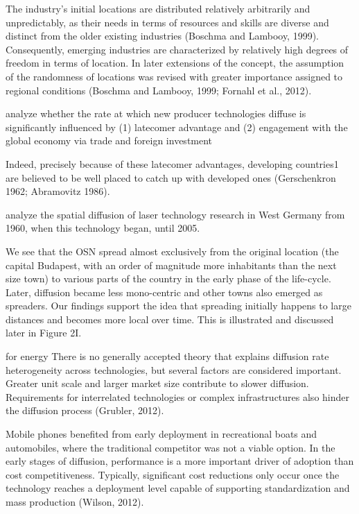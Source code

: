\documentclass[preprint, 3p,
authoryear]{elsarticle} %
\begin{document}
The industry's initial locations are distributed relatively arbitrarily
and unpredictably, as their needs in terms of resources and skills are
diverse and distinct from the older existing industries (Boschma and
Lambooy, 1999). Consequently, emerging industries are characterized by
relatively high degrees of freedom in terms of location. In later
extensions of the concept, the assumption of the randomness of locations
was revised with greater importance assigned to regional conditions
(Boschma and Lambooy, 1999; Fornahl et al., 2012).

\citet{perkins2005international} analyze whether the rate at which new
producer technologies diffuse is significantly influenced by (1)
latecomer advantage and (2) engagement with the global economy via trade
and foreign investment

Indeed, precisely because of these latecomer advantages, developing
countries1 are believed to be well placed to catch up with developed
ones (Gerschenkron 1962; Abramovitz 1986).

\citet{fritsch2015new} analyze the spatial diffusion of laser technology
research in West Germany from 1960, when this technology began, until
2005.

\citet{perkins2011internet}

\citet{lengyel2020role} We see that the OSN spread almost exclusively
from the original location (the capital Budapest, with an order of
magnitude more inhabitants than the next size town) to various parts of
the country in the early phase of the life-cycle. Later, diffusion
became less mono-centric and other towns also emerged as spreaders. Our
findings support the idea that spreading initially happens to large
distances and becomes more local over time. This is illustrated and
discussed later in Figure 2I.

\citet{PAPAGIANNIDIS2015308}

\citet{leibowicz2016representing} for energy There is no generally
accepted theory that explains diffusion rate heterogeneity across
technologies, but several factors are considered important. Greater unit
scale and larger market size contribute to slower diffusion.
Requirements for interrelated technologies or complex infrastructures
also hinder the diffusion process (Grubler, 2012).

Mobile phones benefited from early deployment in recreational boats and
automobiles, where the traditional competitor was not a viable option.
In the early stages of diffusion, performance is a more important driver
of adoption than cost competitiveness. Typically, significant cost
reductions only occur once the technology reaches a deployment level
capable of supporting standardization and mass production (Wilson,
2012).
\end{document}
